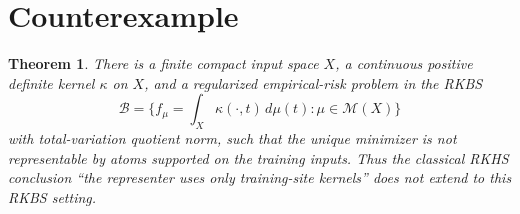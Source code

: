 \documentclass[11pt]{article}
\newtheorem{theorem}{Theorem}
\begin{document}
\section{Counterexample}

\begin{theorem}
\label{thm:training-site-counterexample}
There is a finite compact input space \(X\), a continuous positive definite
kernel \(\kappa\) on \(X\), and a regularized empirical-risk problem in the
RKBS
\[
  \mathcal B=\{f_\mu=\int_X \kappa(\cdot,t)\,d\mu(t):\mu\in\mathcal M(X)\}
\]
with total-variation quotient norm, such that the unique minimizer is not
representable by atoms supported on the training inputs.  Thus the classical
RKHS conclusion ``the representer uses only training-site kernels'' does not
extend to this RKBS setting.
\end{theorem}
\end{document}
